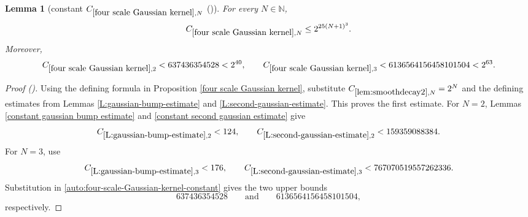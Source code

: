 \documentclass[12pt,reqno]{amsart}
\newcommand{\auto}{{({\tiny\faCar})}}
\theoremstyle{plain}
\newtheorem{lemma}[theorem]{Lemma}
\numberwithin{equation}{section}
\theoremstyle{remark}
\newcommand{\uses}[1]{}
\newcommand{\usesdefs}[1]{}
\newcommand{\N}{{\mathbb N}}
\begin{document}
\begin{lemma}[constant $C_{\ref{four scale Gaussian kernel},N}$ \auto]\label{constant four scale Gaussian kernel}\uses{lem:smoothdecay2,L:gaussian-bump-estimate,L:second-gaussian-estimate,constant gaussian bump estimate,constant second gaussian estimate,four scale Gaussian kernel}\usesdefs{}
For every $N\in\N$,
\begin{equation}\label{constant four scale Gaussian kernel bound}
C_{\ref{four scale Gaussian kernel},N}\le2^{25(N+1)^3}.
\end{equation}
Moreover,
\begin{equation}\label{auto:constant-four-scale-Gaussian-kernel-small}
C_{\ref{four scale Gaussian kernel},2}<637436354528<2^{40},
\qquad
C_{\ref{four scale Gaussian kernel},3}<6136564156458101504<2^{63}.
\end{equation}
\end{lemma}
\begin{proof}[Proof \auto]
Using the defining formula in Proposition \ref{four scale Gaussian kernel}, substitute $C_{\ref{lem:smoothdecay2},N}=2^N$ and the defining estimates from Lemmas \ref{L:gaussian-bump-estimate} and \ref{L:second-gaussian-estimate}. This proves the first estimate. For $N=2$, Lemmas \ref{constant gaussian bump estimate} and \ref{constant second gaussian estimate} give
\[
C_{\ref{L:gaussian-bump-estimate},2}<124,
\qquad
C_{\ref{L:second-gaussian-estimate},2}<159359088384.
\]
For $N=3$, use
\[
C_{\ref{L:gaussian-bump-estimate},3}<176,
\qquad
C_{\ref{L:second-gaussian-estimate},3}<767070519557262336.
\]
Substitution in \eqref{auto:four-scale-Gaussian-kernel-constant} gives the two upper bounds
\[
637436354528
\qquad\text{and}\qquad
6136564156458101504,
\]
respectively.
\end{proof}
\end{document}
